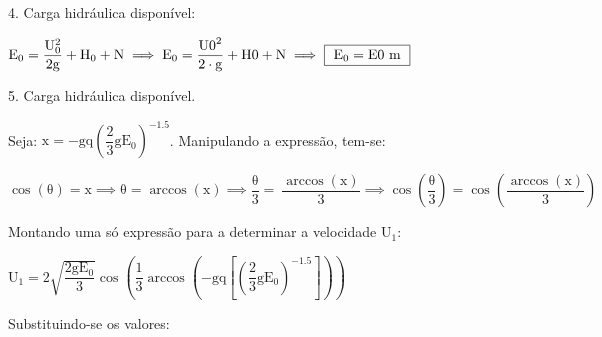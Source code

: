 \documentclass{article}
\newcommand{\myspace}{0.5cm}
\begin{document}
\vspace{\myspace}

4. Carga hidráulica disponível:

\vspace{\myspace}

\begin{center}
	$
		\mathrm
		{
			E_{0} = \dfrac{U_{0}^{2}}{2g} + H_{0} + N 
		} 
		\implies 
		\mathrm
		{
			E_{0} = \dfrac{ {{U0}}^{2}}{2\cdot {{g}} } + {{H0}} + {{N}} 
		}
		\implies
		\fbox
		{ 
			$\mathrm
			{
				E_{0} = {{E0}} \ m
			}
			$
		} 
	$  
\end{center}

\vspace{\myspace}

5. Carga hidráulica disponível.\\

\vspace{\myspace}

Seja: $ \mathrm{x = -gq\left ( \dfrac{2}{3} gE_{0}\right )^{-1.5}}$. Manipulando a expressão, tem-se:

\vspace{\myspace}

\begin{center}
	$	
		\mathrm
		{
			\cos \! \left ( \theta \right ) =x 
			\implies  
			\theta=\arccos \! \left ( x \right ) 
			\implies 
			\dfrac{\theta}{3}=\ \dfrac{\arccos\left ( x \right )}{3} 
			\implies 
			\cos \! \left ( \dfrac{\theta}{3} \right ) = \cos \! \left ( \dfrac{\arccos \! \left( x \right )}{3} \right)
		}
	$
\end{center}

\vspace{\myspace}

Montando uma só expressão para a determinar a velocidade $\mathrm{U_{1}}$: 

\vspace{\myspace}

\begin{center}
	$	
		\mathrm
		{
			U_{1}=2\sqrt{\dfrac{2gE_{0}}{3}}\cos \! \left (\dfrac{1}{3}\arccos \! \left( -gq\left [\left ( \dfrac{2}{3} gE_{0}\right )^{-1.5}  \right ] \right ) \right)
		}
	$
\end{center}

\vspace{\myspace}

Substituindo-se os valores:

\vspace{\myspace}
\end{document}
